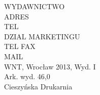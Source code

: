 \noindent WYDAWNICTWO\\
ADRES\\
TEL\\
DZIAL MARKETINGU\\
TEL FAX\\
MAIL\\
\null
\vfill
  \noindent WNT, Wrocław 2013, Wyd. I\\
  Ark. wyd. 46,0\\
  Cieszyńska Drukarnia \\
\pagebreak
